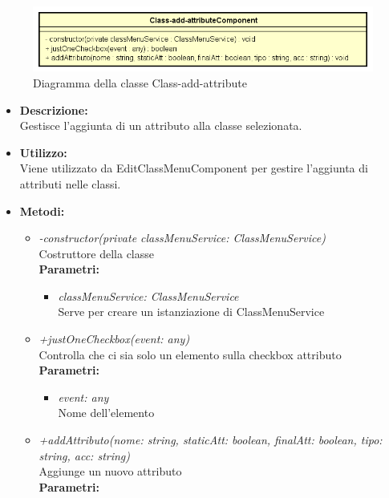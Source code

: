 \begin{figure}[h!]
	\centering
	\includegraphics[scale=0.8]{res/sections/SpecificaFrontEnd/Components/Disegnetti/class-add-attribute.png}
	\caption{Diagramma della classe Class-add-attribute}
\end{figure}

\begin{itemize}
	\item \textbf{Descrizione:}\\
	Gestisce l'aggiunta di un attributo alla classe selezionata.
	\item \textbf{Utilizzo:}\\
	Viene utilizzato da EditClassMenuComponent per gestire l'aggiunta di attributi nelle classi.
	\item \textbf{Metodi:}
		\begin{itemize}
			\item \emph{-constructor(private classMenuService: ClassMenuService)}\\
    		Costruttore della classe\\
    		\textbf{Parametri:}
    		\begin{itemize}
    			\item \emph{classMenuService: ClassMenuService}\\
    			Serve per creare un istanziazione di ClassMenuService
    		\end{itemize}
    		\item \emph{+justOneCheckbox(event: any)}\\
    		Controlla che ci sia solo un elemento sulla checkbox attributo\\
    		\textbf{Parametri:}
    		\begin{itemize}
    			\item \emph{event: any}\\
    			Nome dell'elemento
    		\end{itemize}
    		\item \emph{+addAttributo(nome: string, staticAtt: boolean, finalAtt: boolean, tipo: string, acc: string) }\\
    		Aggiunge un nuovo attributo\\
    		\textbf{Parametri:}
    		\begin{itemize}

\end{itemize}
\end{itemize}
\end{itemize}

